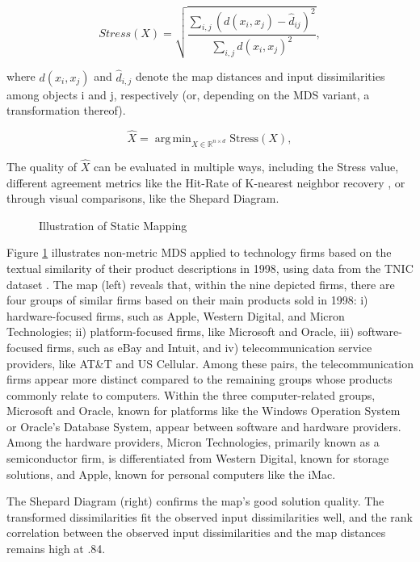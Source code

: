 \documentclass[article]{jss}
\DeclareMathOperator*{\argmin}{arg\,min}  %
\begin{document}
\begin{equation} \label{eq:stress}
  Stress(X) = \sqrt{\frac{\sum_{i,j}(d(x_i, x_j) - \hat{d}_{ij})^2}{\sum_{i,j}d(x_i, x_j)^2}},
\end{equation}

where $d(x_i, x_j)$ and $\hat{d}_{i,j}$ denote the map distances and input dissimilarities among objects i and j, respectively 
(or, depending on the MDS variant, a transformation thereof).

\begin{equation} \label{eq:xhat}
  \hat{X} = \argmin_{X \in \mathbb{R}^{n \times d}} \text{Stress}(X),
\end{equation}

The quality of $\hat{X}$ can be evaluated in multiple ways, including the Stress value, different agreement metrics 
like the Hit-Rate of K-nearest neighbor recovery \cite{Chen+Buja:2009}, or through visual comparisons, like the 
Shepard Diagram.  

\begin{figure}
  \centering
  \caption{\label{fig:static-map} Illustration of Static Mapping}
\end{figure}
  
Figure \ref{fig:static-map} illustrates non-metric MDS applied to technology firms based on the
textual similarity of their product descriptions in 1998, using data from the TNIC dataset \citep{Hoberg+Phillips:2016}.
The map (left) reveals that, within the nine depicted firms, there are four 
groups of similar firms based on their main products sold in 1998: i) hardware-focused firms, such
as Apple, Western Digital, and Micron Technologies; ii) platform-focused firms, like Microsoft and
Oracle, iii) software-focused firms, such as eBay and Intuit, and iv) telecommunication service
providers, like AT\&T and US Cellular. Among these pairs, the telecommunication firms appear
more distinct compared to the remaining groups whose products commonly relate to computers.
Within the three computer-related groups, Microsoft and Oracle, known for platforms like the
Windows Operation System or Oracle’s Database System, appear between software and hardware
providers. Among the hardware providers, Micron Technologies, primarily known as a
semiconductor firm, is differentiated from Western Digital, known for storage solutions, 
and Apple, known for personal computers like the iMac.

The Shepard Diagram (right) confirms the map's good solution quality. The transformed
dissimilarities fit the observed input dissimilarities well, and the rank correlation between the
observed input dissimilarities and the map distances remains high at .84. 
\end{document}

